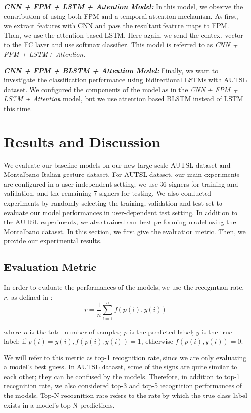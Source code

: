\documentclass[11pt, a4paper, singlecolumn]{article}
\begin{document}
\textit{\textbf{CNN + FPM + LSTM + Attention Model: }} In this model, we observe the contribution of using both FPM and a temporal attention mechanism. At first, we extract features with CNN and pass the resultant feature maps to FPM. Then, we use the attention-based LSTM. Here again, we send the context vector to the FC layer and use softmax classifier. This model is referred to as \textit{CNN + FPM + LSTM+ Attention}.

\textit{\textbf{CNN + FPM + BLSTM + Attention Model: }} Finally, we want to investigate the classification performance using bidirectional LSTMs with AUTSL dataset. We configured the components of the model as in the \textit{CNN + FPM + LSTM + Attention} model, but we use attention based BLSTM instead of LSTM this time.

\section{Results and Discussion}
\label{sec:experimentsResults}
We evaluate our baseline models on our new large-scale AUTSL dataset and Montalbano Italian gesture dataset. For AUTSL dataset, our main experiments are configured in a user-independent setting; we use 36 signers for training and validation, and the remaining 7 signers for testing.  We also conducted experiments by randomly selecting the training, validation and test set to evaluate our model performances in user-dependent test setting. In addition to the AUTSL experiments, we also trained our best performing model using the Montalbano dataset. In this section, we first give the evaluation metric. Then, we provide our experimental results.

\subsection{Evaluation Metric}
\label{sec:evaluationMetric}
In order to evaluate the performances of the models, we use the recognition rate, $r$, as defined in  \cite{wan2016chalearn}:
\begin{equation}
	\label{equ:r}
	r=\frac{1}{n} \sum_{i=1}^{n}f(p(i), y(i))
\end{equation}

where $n$ is the total number of samples; $p$ is the predicted label; $y$ is the true label; if $p(i)= y(i), f(p(i),y(i))=1$, otherwise $f(p(i),y(i))=0$.

We will refer to this metric as top-1 recognition rate, since we are only evaluating a model’s best guess. In AUTSL dataset, some of the signs are quite similar to each other; they can be confused by the models. Therefore, in addition to top-1 recognition rate, we also considered top-3 and top-5 recognition performances of the models. Top-N recognition rate refers to the rate by which the true class label exists in a model’s top-N predictions.
\end{document}
